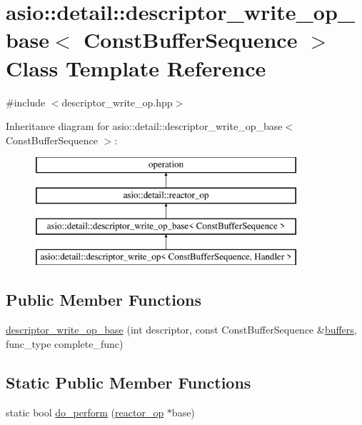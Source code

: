 \hypertarget{classasio_1_1detail_1_1descriptor__write__op__base}{}\section{asio\+:\+:detail\+:\+:descriptor\+\_\+write\+\_\+op\+\_\+base$<$ Const\+Buffer\+Sequence $>$ Class Template Reference}
\label{classasio_1_1detail_1_1descriptor__write__op__base}


{\ttfamily \#include $<$descriptor\+\_\+write\+\_\+op.\+hpp$>$}

Inheritance diagram for asio\+:\+:detail\+:\+:descriptor\+\_\+write\+\_\+op\+\_\+base$<$ Const\+Buffer\+Sequence $>$\+:\begin{figure}[H]
\begin{center}
\leavevmode
\includegraphics[height=4.000000cm]{classasio_1_1detail_1_1descriptor__write__op__base}
\end{center}
\end{figure}
\subsection*{Public Member Functions}
\begin{DoxyCompactItemize}
\item 
\hyperlink{classasio_1_1detail_1_1descriptor__write__op__base_a11389c8629eb24fc9aa39aeaaaf19378}{descriptor\+\_\+write\+\_\+op\+\_\+base} (int descriptor, const Const\+Buffer\+Sequence \&\hyperlink{group__async__read_ga54dede45c3175148a77fe6635222c47d}{buffers}, func\+\_\+type complete\+\_\+func)
\end{DoxyCompactItemize}
\subsection*{Static Public Member Functions}
\begin{DoxyCompactItemize}
\item 
static bool \hyperlink{classasio_1_1detail_1_1descriptor__write__op__base_ad60704fc894c44a39d192526ed51a96d}{do\+\_\+perform} (\hyperlink{classasio_1_1detail_1_1reactor__op}{reactor\+\_\+op} $\ast$base)
\end{DoxyCompactItemize}
